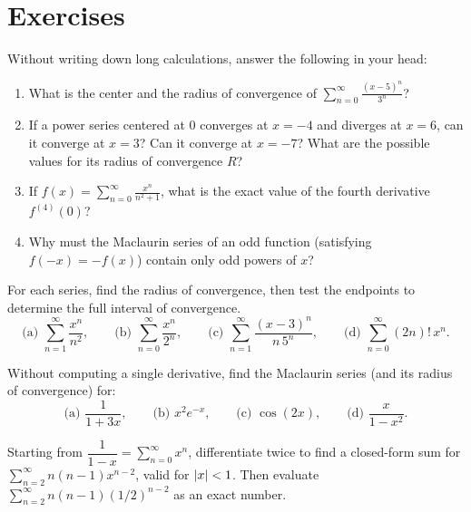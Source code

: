 \section{Exercises}
\label{ch30:sec-exercises}

\begin{exercise}
Without writing down long calculations, answer the following in your head:
\begin{enumerate}[label=(\alph*)]
  \item What is the center and the radius of convergence of $\displaystyle\sum_{n=0}^{\infty}\frac{(x-5)^n}{3^n}$?
  \item If a power series centered at $0$ converges at $x = -4$ and diverges at $x = 6$, can it converge at $x = 3$? Can it converge at $x = -7$? What are the possible values for its radius of convergence $R$?
  \item If $f(x) = \displaystyle\sum_{n=0}^{\infty} \frac{x^n}{n^2+1}$, what is the exact value of the fourth derivative $f^{(4)}(0)$?
  \item Why must the Maclaurin series of an odd function (satisfying $f(-x) = -f(x)$) contain only odd powers of $x$?
\end{enumerate}
\end{exercise}

\begin{exercise}
For each series, find the radius of convergence, then test the endpoints to determine the full interval of convergence.
\[
  \text{(a) } \sum_{n=1}^{\infty}\frac{x^n}{n^2},
  \qquad
  \text{(b) } \sum_{n=0}^{\infty}\frac{x^n}{2^n},
  \qquad
  \text{(c) } \sum_{n=1}^{\infty}\frac{(x-3)^n}{n\,5^n},
  \qquad
  \text{(d) } \sum_{n=0}^{\infty} (2n)!\,x^n.
\]
\end{exercise}

\begin{exercise}
Without computing a single derivative, find the Maclaurin series (and its radius of convergence) for:
\[
  \text{(a) } \frac{1}{1+3x},
  \qquad
  \text{(b) } x^2 e^{-x},
  \qquad
  \text{(c) } \cos(2x),
  \qquad
  \text{(d) } \frac{x}{1-x^2}.
\]
\end{exercise}

\begin{exercise}
Starting from $\dfrac{1}{1-x} = \sum_{n=0}^\infty x^n$, differentiate twice to find a closed-form sum for $\sum_{n=2}^{\infty} n(n-1)x^{n-2}$, valid for $\lvert x\rvert<1$. Then evaluate $\sum_{n=2}^{\infty} n(n-1)(1/2)^{n-2}$ as an exact number.
\end{exercise}

